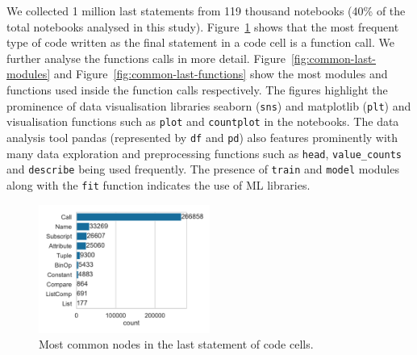 We collected 1 million last statements from 119 thousand notebooks (40\% of the total notebooks analysed in this study). Figure~\ref{fig:common-last-nodes} shows that the most frequent type of code written as the final statement in a code cell is a function call. We further analyse the functions calls in more detail. Figure~\ref{fig:common-last-modules} and Figure~\ref{fig:common-last-functions} show the most modules and functions used inside the function calls respectively. The figures highlight the prominence of data visualisation libraries seaborn (\lstinline{sns}) and matplotlib (\lstinline{plt}) and visualisation functions such as \lstinline{plot} and \lstinline{countplot} in the notebooks. The data analysis tool pandas (represented by \lstinline{df} and \lstinline{pd}) also features prominently with many data exploration and preprocessing functions such as \lstinline{head}, \lstinline{value_counts} and \lstinline{describe} being used frequently. The presence of \lstinline{train} and \lstinline{model} modules along with the \lstinline{fit} function indicates the use of ML libraries.

\begin{figure}
  \centering
  \includegraphics[width=0.5\textwidth]{common-last-nodes.pdf}
  \caption{Most common nodes in the last statement of code cells.}
  \label{fig:common-last-nodes}
\end{figure}

